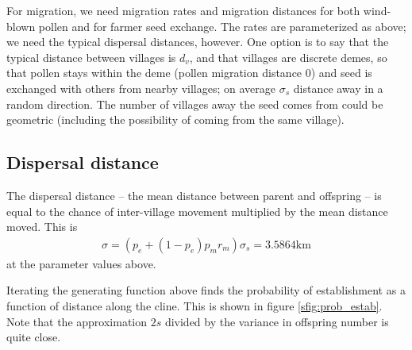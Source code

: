 For migration, we need migration rates and migration distances for both wind-blown pollen
and for farmer seed exchange.
The rates are parameterized as above;
we need the typical dispersal distances, however.
One option is to say that the typical distance between villages is $d_v$,
and that villages are discrete demes,
so that pollen stays within the deme (pollen migration distance 0)
and seed is exchanged with others from nearby villages;
on average $\sigma_s$ distance away in a random direction.
The number of villages away the seed comes from could be geometric 
(including the possibility of coming from the same village).

\subsection*{Dispersal distance}

The dispersal distance
-- the mean distance between parent and offspring --
is equal to the chance of inter-village movement
multiplied by the mean distance moved.
This is
\begin{align}
  \sigma = (p_e + (1-p_e) p_m r_m ) \sigma_s = 3.5864 \text{km}
\end{align}
at the parameter values above.

Iterating the generating function above finds the probability of establishment as a function of distance along the cline.
This is shown in figure \ref{sfig:prob_estab}.
Note that the approximation $2s$ divided by the variance in offspring number is quite close.

